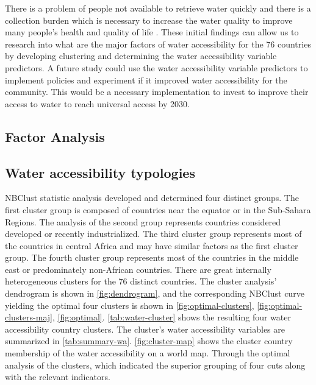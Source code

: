 \documentclass[10pt,twoside]{article}
\numberwithin{equation}{section}
\newcommand{\?}{\stackrel{?}{=}}
\begin{document}
There is a problem of people not available to retrieve water quickly and there is a collection burden which is necessary to increase the water quality to improve many people's health and quality of life \citep{cassivi2018access}. These initial findings can allow us to research into what are the major factors of water accessibility for the 76 countries by developing clustering and determining the water accessibility variable predictors. A future study could use the water accessibility variable predictors to implement policies and experiment if it improved water accessibility for the community. This would be a necessary implementation to invest to improve their access to water to reach universal access by 2030.


\subsection{Factor Analysis}

\subsection{Water accessibility typologies}

NBClust statistic analysis developed and determined four distinct groups. The first cluster group is composed of countries near the equator or in the Sub-Sahara Regions. The analysis of the second group represents countries considered developed or recently industrialized. The third cluster group represents most of the countries in central Africa and may have similar factors as the first cluster group. The fourth cluster group represents most of the countries in the middle east or predominately non-African countries. There are great internally heterogeneous clusters for the 76 distinct countries. The cluster analysis' dendrogram is shown in \autoref{fig:dendrogram}, and the corresponding NBClust curve yielding the optimal four clusters is shown in \autoref{fig:optimal-clusters}, \autoref{fig:optimal-clusters-maj}, \autoref{fig:optimal}. \autoref{tab:water-cluster} shows the resulting four water accessibility country clusters. The cluster's water accessibility variables are summarized in \autoref{tab:summary-wa}. \autoref{fig:cluster-map} shows the cluster country membership of the water accessibility on a world map.  Through the optimal analysis of the clusters, which indicated the superior grouping of four cuts along with the relevant indicators. 
\end{document}
